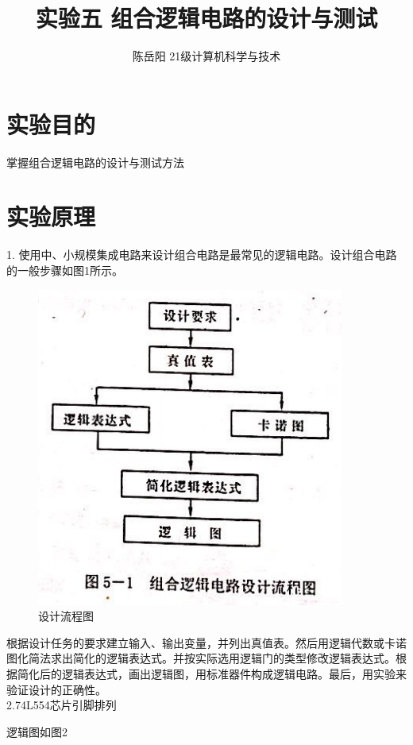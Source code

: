 \documentclass{article}
\title{实验五 组合逻辑电路的设计与测试}
\author{陈岳阳 21级计算机科学与技术}
\begin{document}
\maketitle
\tableofcontents

\newpage
\section{实验目的}
掌握组合逻辑电路的设计与测试方法

\section{实验原理}
1. 使用中、小规模集成电路来设计组合电路是最常见的逻辑电路。设计组合电路的一般步骤如图1所示。

\begin{figure}[htbp]
\centering
\includegraphics[scale=0.5]{1.png}
\caption{设计流程图}
\label{figure}
\end{figure}

根据设计任务的要求建立输入、输出变量，并列出真值表。然后用逻辑代数或卡诺图化简法求出简化的逻辑表达式。并按实际选用逻辑门的类型修改逻辑表达式。根据简化后的逻辑表达式，画出逻辑图，用标准器件构成逻辑电路。最后，用实验来验证设计的正确性。\\


2.74L554芯片引脚排列

逻辑图如图2
\end{document}
